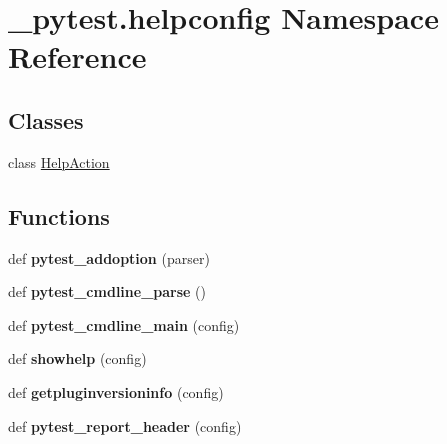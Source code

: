 \hypertarget{namespace__pytest_1_1helpconfig}{}\section{\+\_\+pytest.\+helpconfig Namespace Reference}
\label{namespace__pytest_1_1helpconfig}
\subsection*{Classes}
\begin{DoxyCompactItemize}
\item 
class \hyperlink{class__pytest_1_1helpconfig_1_1_help_action}{Help\+Action}
\end{DoxyCompactItemize}
\subsection*{Functions}
\begin{DoxyCompactItemize}
\item 
\mbox{\label{namespace__pytest_1_1helpconfig_ad2be9b530abe8565016f688136767ca5}} 
def {\bfseries pytest\+\_\+addoption} (parser)
\item 
\mbox{\label{namespace__pytest_1_1helpconfig_a29c57b1ffaea5e0595b276e06507d824}} 
def {\bfseries pytest\+\_\+cmdline\+\_\+parse} ()
\item 
\mbox{\label{namespace__pytest_1_1helpconfig_a4067996af47dd28d9e3de3bbeab5c2f6}} 
def {\bfseries pytest\+\_\+cmdline\+\_\+main} (config)
\item 
\mbox{\label{namespace__pytest_1_1helpconfig_a08d66870212936fa41e9477f43db85c8}} 
def {\bfseries showhelp} (config)
\item 
\mbox{\label{namespace__pytest_1_1helpconfig_a077fc752150b7e92051115ec800951ce}} 
def {\bfseries getpluginversioninfo} (config)
\item 
\mbox{\label{namespace__pytest_1_1helpconfig_a624b9c2e3e55022fef30ac38f5043a32}} 
def {\bfseries pytest\+\_\+report\+\_\+header} (config)
\end{DoxyCompactItemize}

